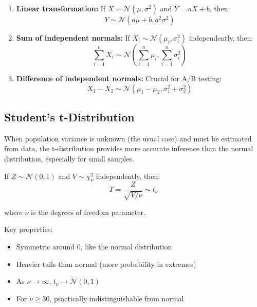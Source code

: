 \begin{proposition}
\begin{enumerate}
    \item \textbf{Linear transformation:} If $X \sim \mathcal{N}(\mu, \sigma^2)$ and $Y = aX + b$, then:
    \begin{equation}
    Y \sim \mathcal{N}(a\mu + b, a^2\sigma^2)
    \end{equation}

    \item \textbf{Sum of independent normals:} If $X_i \sim \mathcal{N}(\mu_i, \sigma_i^2)$ independently, then:
    \begin{equation}
    \sum_{i=1}^n X_i \sim \mathcal{N}\left(\sum_{i=1}^n \mu_i, \sum_{i=1}^n \sigma_i^2\right)
    \end{equation}

    \item \textbf{Difference of independent normals:} Crucial for A/B testing:
    \begin{equation}
    X_1 - X_2 \sim \mathcal{N}(\mu_1 - \mu_2, \sigma_1^2 + \sigma_2^2)
    \end{equation}
\end{enumerate}
\end{proposition}

\subsection{Student's t-Distribution}

When population variance is unknown (the usual case) and must be estimated from data, the t-distribution provides more accurate inference than the normal distribution, especially for small samples.

\begin{definition}
If $Z \sim \mathcal{N}(0,1)$ and $V \sim \chi^2_\nu$ independently, then:
\begin{equation}
T = \frac{Z}{\sqrt{V/\nu}} \sim t_\nu
\end{equation}

where $\nu$ is the degrees of freedom parameter.
\end{definition}

Key properties:
\begin{itemize}
    \item Symmetric around 0, like the normal distribution
    \item Heavier tails than normal (more probability in extremes)
    \item As $\nu \rightarrow \infty$, $t_\nu \to \mathcal{N}(0,1)$
    \item For $\nu \geq 30$, practically indistinguishable from normal
\end{itemize}


